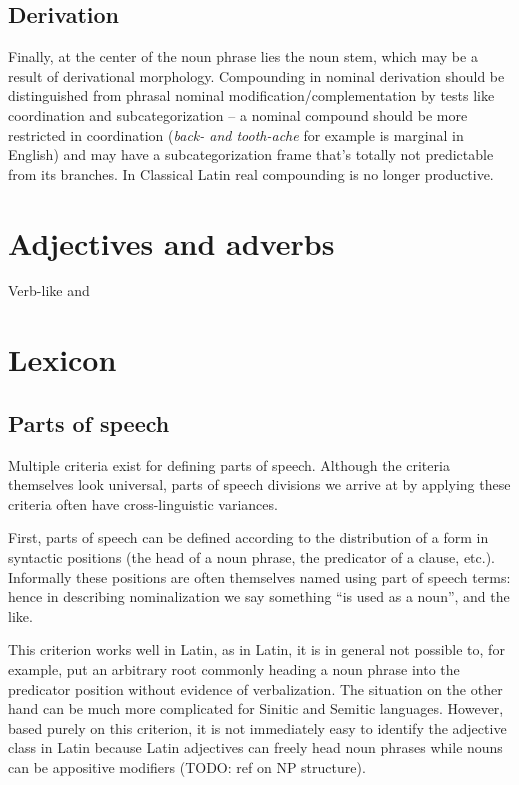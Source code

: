 \documentclass[a4paper, oneside, 12pt]{report}
\newcommand{\form}[1]{\emph{#1}}
\begin{document}
\subsection{Derivation}

Finally, at the center of the noun phrase lies the noun stem,
which may be a result of derivational morphology.
Compounding in nominal derivation should be distinguished from
phrasal nominal modification/complementation
by tests like coordination and subcategorization
-- a nominal compound should be more restricted in coordination
(\form{back- and tooth-ache} for example is marginal in English)
and may have a subcategorization frame that's totally not predictable
from its branches.
In Classical Latin real compounding is no longer productive.

\section{Adjectives and adverbs}\label{sec:grammatical.modify}

Verb-like and 

\section{Lexicon}

\subsection{Parts of speech}\label{sec:grammatical.pos}

Multiple criteria exist for defining parts of speech.
Although the criteria themselves look universal,
parts of speech divisions we arrive at by applying these criteria often have cross-linguistic variances.

First, parts of speech can be defined according to the distribution of a form in syntactic positions (the head of a noun phrase, the predicator of a clause, etc.).
Informally these positions are often themselves named using part of speech terms:
hence in describing nominalization we say something ``is used as a noun'', and the like.


This criterion works well in Latin, as in Latin, it is in general not possible to, for example, put an arbitrary root commonly heading a noun phrase into the predicator position without evidence of verbalization.
The situation on the other hand can be much more complicated for Sinitic and Semitic languages.
However, based purely on this criterion, it is not immediately easy to identify the adjective class in Latin because Latin adjectives can freely head noun phrases while nouns can be appositive modifiers (TODO: ref on NP structure).
\end{document}
